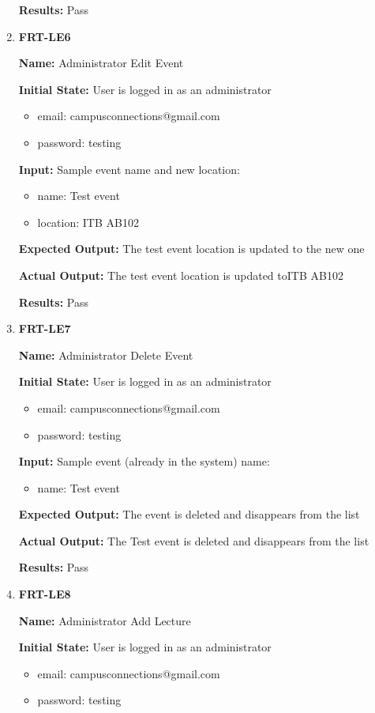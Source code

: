 \documentclass[12pt, titlepage]{article}
\begin{document}
\begin{enumerate}
\textbf{Results:} Pass

\item \textbf{FRT-LE6}

\textbf{Name:} Administrator Edit Event

\textbf{Initial State:} User is logged in as an administrator
\begin{itemize}
\item email: campusconnections@gmail.com
\item password: testing
\end{itemize}

\textbf{Input:} Sample event name and new location:
\begin{itemize}
\item name: Test event
\item location: ITB AB102
\end{itemize}
					
\textbf{Expected Output:} The test event location is updated to the new one

\textbf{Actual Output:} The test event location is updated toITB AB102

\textbf{Results:} Pass

\item \textbf{FRT-LE7}

\textbf{Name:} Administrator Delete Event

\textbf{Initial State:} User is logged in as an administrator
\begin{itemize}
\item email: campusconnections@gmail.com
\item password: testing
\end{itemize}

\textbf{Input:} Sample event (already in the system) name:
\begin{itemize}
\item name: Test event
\end{itemize}
					
\textbf{Expected Output:} The event is deleted and disappears from the list

\textbf{Actual Output:} The Test event is deleted and disappears from the list

\textbf{Results:} Pass

\item \textbf{FRT-LE8}

\textbf{Name:} Administrator Add Lecture

\textbf{Initial State:} User is logged in as an administrator
\begin{itemize}
\item email: campusconnections@gmail.com
\item password: testing
\end{itemize}


\end{enumerate}
\end{document}
